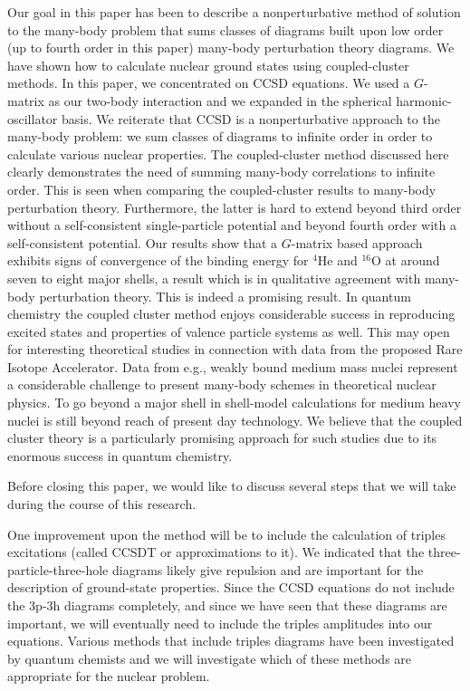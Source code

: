 Our goal in this paper has been to describe a nonperturbative method of 
solution to the many-body problem that sums classes of diagrams built upon
low order (up to fourth order in this paper) many-body perturbation theory
diagrams. We have shown how to calculate nuclear ground states using 
coupled-cluster methods. In this paper, 
we concentrated on CCSD equations. 
We used a $G$-matrix as our two-body interaction and 
we expanded in the spherical harmonic-oscillator basis. We reiterate that
CCSD is a nonperturbative approach to the many-body problem: we sum 
classes of diagrams to infinite order in order to calculate various
nuclear properties.  The coupled-cluster method discussed here 
clearly demonstrates the need of summing 
many-body correlations to infinite order. 
This is seen when comparing the coupled-cluster results to many-body 
perturbation theory. Furthermore, the latter
is hard to extend beyond third order  
without a self-consistent single-particle potential and beyond 
fourth order with a self-consistent potential.  
Our results show that a $G$-matrix based approach exhibits signs of convergence
of the binding energy for $^{4}$He and $^{16}$O at around seven to eight
major shells, a result which is in qualitative agreement with many-body
perturbation theory. This is indeed a promising result. 
In quantum chemistry the coupled cluster method enjoys considerable success
in reproducing excited states and properties of valence particle systems as well.
This may open for interesting theoretical studies in connection with data
from the proposed Rare Isotope Accelerator. Data from e.g., weakly bound
medium mass nuclei represent a considerable challenge to present many-body
schemes in theoretical nuclear physics.
To go beyond a major shell in shell-model
calculations for medium heavy  nuclei is
still beyond reach of present day  technology. We believe that 
the coupled cluster theory is a particularly promising approach for such 
studies due to its enormous success in quantum chemistry.

Before closing
this paper, we would like to discuss several steps that we will take 
during the course of this research. 

One improvement upon the method will be to include the calculation of 
triples excitations (called CCSDT or approximations to it). We indicated 
that the three-particle-three-hole diagrams likely give repulsion and are
important for the description of ground-state properties. Since the CCSD
equations do not include the 3p-3h diagrams completely, and since we have
seen that these diagrams are important, we will eventually need to 
include the triples amplitudes into our equations. Various methods
that include triples diagrams have been investigated by quantum 
chemists and we will investigate which of these methods are appropriate
for the nuclear problem. 

